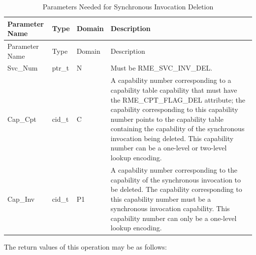\begin{xltabular}{\textwidth}{@{}>{\hsize\raggedright\arraybackslash}X>{\hsize\raggedright\arraybackslash}X>{\hsize\raggedright\arraybackslash}X>{\hsize\raggedright\arraybackslash}X@{}}
\caption{Parameters Needed for Synchronous Invocation Deletion}\label{tab:5-6-delete-sync-invocation-parameters}\\
\toprule
Parameter Name & Type & Domain & Description\tabularnewline
\endfirsthead
\toprule
Parameter Name & Type & Domain & Description\tabularnewline
\midrule
\endhead
\bottomrule
\endlastfoot
Svc\_Num & ptr\_t & N & Must be RME\_SVC\_INV\_DEL.\tabularnewline
Cap\_Cpt & cid\_t & C &
A capability number corresponding to a capability table capability that must have the RME\_CPT\_FLAG\_DEL attribute; the capability corresponding to this capability number points to the capability table containing the capability of the synchronous invocation being deleted. This capability number can be a one-level or two-level lookup encoding.\tabularnewline
Cap\_Inv & cid\_t & P1 &
A capability number corresponding to the capability of the synchronous invocation to be deleted. The capability corresponding to this capability number must be a synchronous invocation capability. This capability number can only be a one-level lookup encoding.\tabularnewline
\end{xltabular}
\nopagebreak[4]

The return values of this operation may be as follows:


